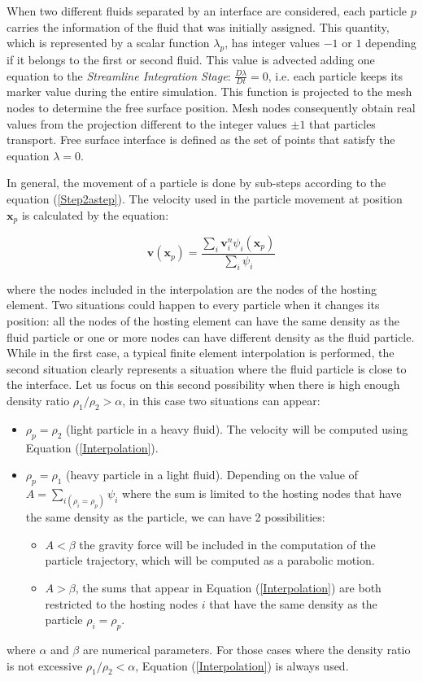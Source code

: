 When two different fluids separated by an interface are considered, each particle $p$ carries the information of the fluid that was initially assigned. This quantity, which is represented by a scalar function $\lambda_p$, has integer values $-1$ or $1$ depending if it belongs to the first or second fluid. This value is advected adding one equation to the \textit{Streamline Integration Stage}: $\frac{D\lambda}{Dt}=0$, i.e. each particle keeps its marker value during the entire simulation. This function is projected to the mesh nodes to determine the free surface position. Mesh nodes consequently obtain real values from the projection different to the integer values $\pm1$ that particles transport. Free surface interface is defined as the set of points that satisfy the equation $\lambda=0$.

In general, the movement of a particle is done by sub-steps according to the equation (\ref{Step2astep}). The velocity used in the particle movement at position $\mathbf{x}_p$ is calculated by the equation:

\begin{equation}\label{Interpolation}
    \displaystyle \mathbf{v}(\mathbf{x}_p)=\frac{\sum_{i}\mathbf{v}_i^n\psi_i(\mathbf{x}_p)}{\sum_{i}\psi_i}
\end{equation}

where the nodes included in the interpolation are the nodes of the hosting element. Two situations could happen to every particle when it changes its position: all the nodes of the hosting element can have the same density as the fluid particle or one or more nodes can have different density as the fluid particle. While in the first case, a typical finite element interpolation is performed, the second situation clearly represents a situation where the fluid particle is close to the interface. Let us focus on  this second possibility when there is high enough density ratio $\rho_1/\rho_2>\alpha$, in this case two situations can appear:

 \begin{itemize}
 \item $\rho_p=\rho_2$ (light particle in a heavy fluid). The velocity will be computed using Equation (\ref{Interpolation}).
   \item $\rho_p=\rho_1$ (heavy particle in a light fluid). Depending on the value of $A=\sum_{i(\rho_i=\rho_p)}\psi_i$ where the sum is limited to the hosting nodes that have the same density as the particle, we can have 2 possibilities:
       \begin{itemize}
 \item $A<\beta$ the gravity force will be included in the computation of the particle trajectory, which will be computed as a parabolic motion.
   \item $A>\beta$, the sums that appear in Equation (\ref{Interpolation}) are both restricted to the hosting nodes $i$ that have the same density as the particle $\rho_i=\rho_p$.
 \end{itemize}
 \end{itemize}
 where $\alpha$ and $\beta$ are numerical parameters. For those cases where the density ratio is not excessive $\rho_1/\rho_2<\alpha$, Equation (\ref{Interpolation}) is always used.
 
